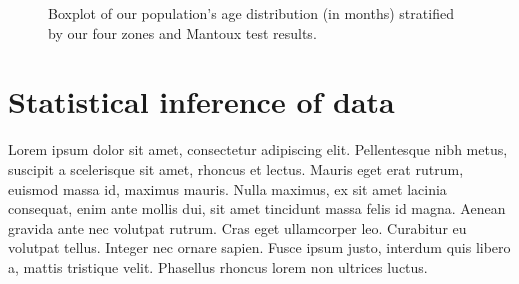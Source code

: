 \begin{figure}[H]
\caption{Boxplot of our population's age distribution (in months) stratified by our four zones and Mantoux test results.}
\label{fig:boxplot_Mantoux}
\end{figure}

\section{Statistical inference of data}\label{sec:statisticalinference}
Lorem ipsum dolor sit amet, consectetur adipiscing elit. Pellentesque nibh metus, suscipit a scelerisque sit amet, rhoncus et lectus. Mauris eget erat rutrum, euismod massa id, maximus mauris. Nulla maximus, ex sit amet lacinia consequat, enim ante mollis dui, sit amet tincidunt massa felis id magna. Aenean gravida ante nec volutpat rutrum. Cras eget ullamcorper leo. Curabitur eu volutpat tellus. Integer nec ornare sapien. Fusce ipsum justo, interdum quis libero a, mattis tristique velit. Phasellus rhoncus lorem non ultrices luctus.

